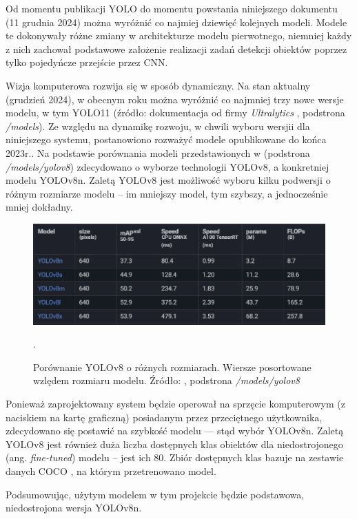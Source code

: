 Od momentu publikacji YOLO do momentu powstania niniejszego dokumentu (11 grudnia 2024) można wyróżnić co najmiej dziewięć kolejnych modeli. Modele te dokonywały różne zmiany w architekturze modelu pierwotnego, niemniej każdy z nich zachował podstawowe założenie realizacji zadań detekcji obiektów poprzez tylko pojedyńcze przejście przez CNN. 

Wizja komputerowa rozwija się w sposób dynamiczny. Na stan aktualny (grudzień 2024), w obecnym roku można wyróżnić co najmniej trzy nowe wersje modelu, w tym YOLO11 \cite{yolo11_ultralytics} (źródło: dokumentacja od firmy \emph{Ultralytics} \cite{yolo_docs}, podstrona \emph{/models}).
Ze względu na dynamikę rozwoju, w chwili wyboru wersjii dla niniejszego systemu, postanowiono rozważyć modele opublikowane do końca 2023r.. Na podstawie porównania modeli przedstawionych w \cite{yolo_docs} (podstrona \emph{/models/yolov8}) zdecydowano o wyborze technologii YOLOv8, a konkretniej modelu YOLOv8n. Zaletą YOLOv8 jest możliwość wyboru kilku podwersji o różnym rozmiarze modelu -- im mniejszy model, tym szybszy, a jednocześnie mniej dokładny.

\begin{figure}[H]
    \centering
    \includegraphics[width=\linewidth]{r_technologie/AI_assets/yolo8_sizes.png}
    \caption{Porównanie YOLOv8 o różnych rozmiarach. Wiersze posortowane wzlędem rozmiaru modelu. Źródło: \cite{yolo_docs}, podstrona \emph{/models/yolov8}}.
    \label{fig:yolo8-sizes}
\end{figure}

Ponieważ zaprojektowany system będzie operował na sprzęcie komputerowym (z naciskiem na kartę graficzną) posiadanym przez przeciętnego użytkownika, zdecydowano się postawić na szybkość modelu --- stąd wybór YOLOv8n. Zaletą YOLOv8 jest również duża liczba dostępnych klas obiektów dla niedostrojonego (ang. \emph{fine-tuned}) modelu -- jest ich 80. Zbiór dostępnych klas bazuje na zestawie danych COCO \cite{COCO_docs}, na którym przetrenowano model.

Podsumowując, użytym modelem w tym projekcie będzie podstawowa, niedostrojona wersja YOLOv8n. 



